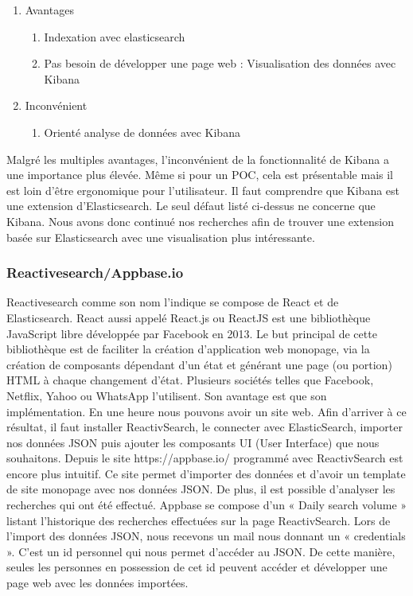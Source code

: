 \begin{enumerate}
    \item Avantages 
        \begin{enumerate}
            \item Indexation avec elasticsearch
            \item Pas besoin de développer une page web : Visualisation des données avec Kibana
        \end{enumerate}
    \item Inconvénient 
        \begin{enumerate}
        \item Orienté analyse de données avec Kibana
        \end{enumerate}
\end{enumerate}

Malgré les multiples avantages, l’inconvénient de la fonctionnalité de Kibana a une importance plus élevée. Même si pour un POC, cela est présentable mais il est loin d’être ergonomique pour l’utilisateur.
Il faut comprendre que Kibana est une extension d’Elasticsearch. Le seul défaut listé ci-dessus ne concerne que Kibana. Nous avons donc continué nos recherches afin de trouver une extension basée sur Elasticsearch avec une visualisation plus intéressante.

\subsubsection{Reactivesearch/Appbase.io}

Reactivesearch comme son nom l’indique se compose de React et de Elasticsearch. React aussi appelé React.js ou ReactJS est une bibliothèque JavaScript libre développée par Facebook en 2013. Le but principal de cette bibliothèque est de faciliter la création d’application web monopage, via la création de composants dépendant d'un état et générant une page (ou portion) HTML à chaque changement d'état.
Plusieurs sociétés telles que Facebook, Netflix, Yahoo ou WhatsApp l’utilisent. Son avantage est que son implémentation. En une heure nous pouvons avoir un site web. Afin d’arriver à ce résultat, il faut installer ReactivSearch, le connecter avec ElasticSearch, importer nos données JSON puis ajouter les composants UI (User Interface) que nous souhaitons. 
Depuis le site https://appbase.io/ programmé avec ReactivSearch est encore plus intuitif. Ce site permet d’importer des données et d’avoir un template de site monopage avec nos données JSON. De plus, il est possible d’analyser les recherches qui ont été effectué. Appbase se compose d’un « Daily search volume » listant l’historique des recherches effectuées sur la page ReactivSearch. 
Lors de l’import des données JSON, nous recevons un mail nous donnant un « credentials ». C’est un id personnel qui nous permet d’accéder au JSON. De cette manière, seules les personnes en possession de cet id peuvent accéder et développer une page web avec les données importées. 

